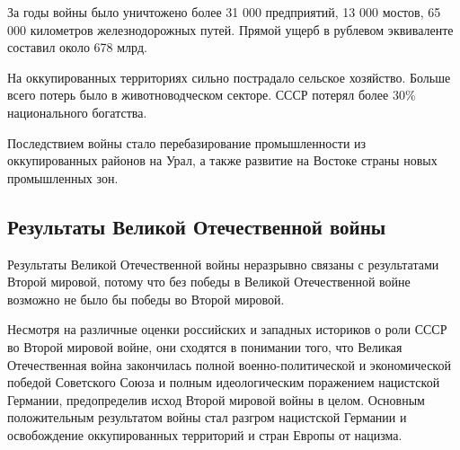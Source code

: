 \documentclass[12pt]{article}
\begin{document}
  За годы войны было уничтожено более 31 000 предприятий, 13 000 мостов, 65 000 километров железнодорожных путей.
  Прямой ущерб в рублевом эквиваленте составил около 678 млрд.

  На оккупированных территориях сильно пострадало сельское хозяйство.
  Больше всего потерь было в животноводческом секторе.
  СССР потерял более 30\% национального богатства.

  Последствием войны стало перебазирование промышленности из оккупированных районов на Урал,
  а также развитие на Востоке страны новых промышленных зон.

  \subsection{Результаты Великой Отечественной войны}
  Результаты Великой Отечественной войны неразрывно связаны с результатами Второй мировой,
  потому что без победы в Великой Отечественной войне возможно не было бы победы во Второй мировой.

  Несмотря на различные оценки российских и западных историков о роли СССР во Второй мировой войне, они сходятся в понимании того,
  что Великая Отечественная война закончилась полной военно-политической и экономической победой Советского Союза
  и полным идеологическим поражением нацистской Германии,
  предопределив исход Второй мировой войны в целом.
  Основным положительным результатом войны стал разгром нацистской Германии
  и освобождение оккупированных территорий и стран Европы от нацизма.
\end{document}
